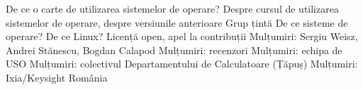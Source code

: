 De ce o carte de utilizarea sistemelor de operare?
Despre cursul de utilizarea sistemelor de operare, despre versiunile anterioare
Grup țintă
De ce sisteme de operare?
De ce Linux?
Licență open, apel la contribuții
Mulțumiri: Sergiu Weisz, Andrei Stănescu, Bogdan Calapod
Mulțumiri: recenzori
Mulțumiri: echipa de USO
Mulțumiri: colectivul Departamentului de Calculatoare (Țăpuș)
Mulțumiri: Ixia/Keysight România
